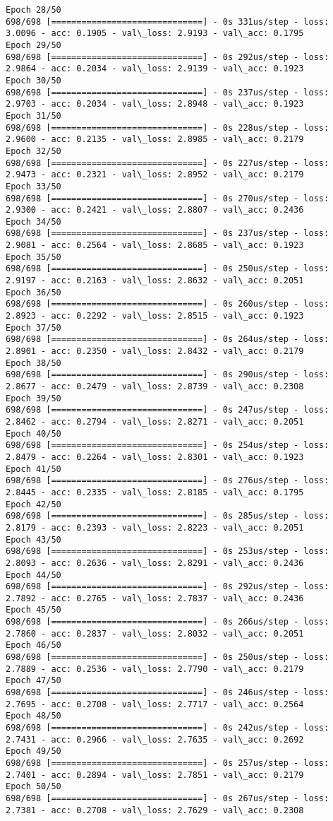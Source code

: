 \documentclass[11pt]{article}
\begin{document}
\begin{Verbatim}[commandchars=\\\{\}]
Epoch 28/50
698/698 [==============================] - 0s 331us/step - loss: 3.0096 - acc: 0.1905 - val\_loss: 2.9193 - val\_acc: 0.1795
Epoch 29/50
698/698 [==============================] - 0s 292us/step - loss: 2.9864 - acc: 0.2034 - val\_loss: 2.9139 - val\_acc: 0.1923
Epoch 30/50
698/698 [==============================] - 0s 237us/step - loss: 2.9703 - acc: 0.2034 - val\_loss: 2.8948 - val\_acc: 0.1923
Epoch 31/50
698/698 [==============================] - 0s 228us/step - loss: 2.9600 - acc: 0.2135 - val\_loss: 2.8985 - val\_acc: 0.2179
Epoch 32/50
698/698 [==============================] - 0s 227us/step - loss: 2.9473 - acc: 0.2321 - val\_loss: 2.8952 - val\_acc: 0.2179
Epoch 33/50
698/698 [==============================] - 0s 270us/step - loss: 2.9300 - acc: 0.2421 - val\_loss: 2.8807 - val\_acc: 0.2436
Epoch 34/50
698/698 [==============================] - 0s 237us/step - loss: 2.9081 - acc: 0.2564 - val\_loss: 2.8685 - val\_acc: 0.1923
Epoch 35/50
698/698 [==============================] - 0s 250us/step - loss: 2.9197 - acc: 0.2163 - val\_loss: 2.8632 - val\_acc: 0.2051
Epoch 36/50
698/698 [==============================] - 0s 260us/step - loss: 2.8923 - acc: 0.2292 - val\_loss: 2.8515 - val\_acc: 0.1923
Epoch 37/50
698/698 [==============================] - 0s 264us/step - loss: 2.8901 - acc: 0.2350 - val\_loss: 2.8432 - val\_acc: 0.2179
Epoch 38/50
698/698 [==============================] - 0s 290us/step - loss: 2.8677 - acc: 0.2479 - val\_loss: 2.8739 - val\_acc: 0.2308
Epoch 39/50
698/698 [==============================] - 0s 247us/step - loss: 2.8462 - acc: 0.2794 - val\_loss: 2.8271 - val\_acc: 0.2051
Epoch 40/50
698/698 [==============================] - 0s 254us/step - loss: 2.8479 - acc: 0.2264 - val\_loss: 2.8301 - val\_acc: 0.1923
Epoch 41/50
698/698 [==============================] - 0s 276us/step - loss: 2.8445 - acc: 0.2335 - val\_loss: 2.8185 - val\_acc: 0.1795
Epoch 42/50
698/698 [==============================] - 0s 285us/step - loss: 2.8179 - acc: 0.2393 - val\_loss: 2.8223 - val\_acc: 0.2051
Epoch 43/50
698/698 [==============================] - 0s 253us/step - loss: 2.8093 - acc: 0.2636 - val\_loss: 2.8291 - val\_acc: 0.2436
Epoch 44/50
698/698 [==============================] - 0s 292us/step - loss: 2.7892 - acc: 0.2765 - val\_loss: 2.7837 - val\_acc: 0.2436
Epoch 45/50
698/698 [==============================] - 0s 266us/step - loss: 2.7860 - acc: 0.2837 - val\_loss: 2.8032 - val\_acc: 0.2051
Epoch 46/50
698/698 [==============================] - 0s 250us/step - loss: 2.7889 - acc: 0.2536 - val\_loss: 2.7790 - val\_acc: 0.2179
Epoch 47/50
698/698 [==============================] - 0s 246us/step - loss: 2.7695 - acc: 0.2708 - val\_loss: 2.7717 - val\_acc: 0.2564
Epoch 48/50
698/698 [==============================] - 0s 242us/step - loss: 2.7431 - acc: 0.2966 - val\_loss: 2.7635 - val\_acc: 0.2692
Epoch 49/50
698/698 [==============================] - 0s 257us/step - loss: 2.7401 - acc: 0.2894 - val\_loss: 2.7851 - val\_acc: 0.2179
Epoch 50/50
698/698 [==============================] - 0s 267us/step - loss: 2.7381 - acc: 0.2708 - val\_loss: 2.7629 - val\_acc: 0.2308

    \end{Verbatim}
\end{document}
